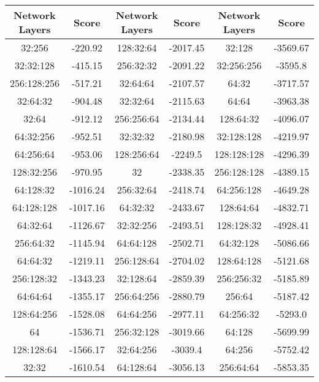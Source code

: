     
\begin{table}[h]
    \centering
    \begin{tabular}{|c|c||c|c||c|c|}
    \hline
    Network Layers & Score & Network Layers & Score & Network Layers & Score \\
    \hline
    32:256 & -220.92 & 128:32:64 & -2017.45 & 32:128 & -3569.67 \\
    \hline
    32:32:128 & -415.15 & 256:32:32 & -2091.22 & 32:256:256 & -3595.8 \\
    \hline
    256:128:256 & -517.21 & 32:64:64 & -2107.57 & 64:32 & -3717.57 \\
    \hline
    32:64:32 & -904.48 & 32:32:64 & -2115.63 & 64:64 & -3963.38 \\
    \hline
    32:64 & -912.12 & 256:256:64 & -2134.44 & 128:64:32 & -4096.07 \\
    \hline
    64:32:256 & -952.51 & 32:32:32 & -2180.98 & 32:128:128 & -4219.97 \\
    \hline
    64:256:64 & -953.06 & 128:256:64 & -2249.5 & 128:128:128 & -4296.39 \\
    \hline
    128:32:256 & -970.95 & 32 & -2338.35 & 256:128:128 & -4389.15 \\
    \hline
    64:128:32 & -1016.24 & 256:32:64 & -2418.74 & 64:256:128 & -4649.28 \\
    \hline
    64:128:128 & -1017.16 & 64:32:32 & -2433.67 & 128:64:64 & -4832.71 \\
    \hline
    64:32:64 & -1126.67 & 32:32:256 & -2493.51 & 128:128:32 & -4928.41 \\
    \hline
    256:64:32 & -1145.94 & 64:64:128 & -2502.71 & 64:32:128 & -5086.66 \\
    \hline
    64:64:32 & -1219.11 & 256:128:64 & -2704.02 & 128:64:128 & -5121.68 \\
    \hline
    256:128:32 & -1343.23 & 32:128:64 & -2859.39 & 256:256:32 & -5185.89 \\
    \hline
    64:64:64 & -1355.17 & 256:64:256 & -2880.79 & 256:64 & -5187.42 \\
    \hline
    128:64:256 & -1528.08 & 64:64:256 & -2977.11 & 64:256:32 & -5293.0 \\
    \hline
    64 & -1536.71 & 256:32:128 & -3019.66 & 64:128 & -5699.99 \\
    \hline
    128:128:64 & -1566.17 & 32:64:256 & -3039.4 & 64:256 & -5752.42 \\
    \hline
    32:32 & -1610.54 & 64:128:64 & -3056.13 & 256:64:64 & -5853.35 \\

\end{tabular}
\end{table}
